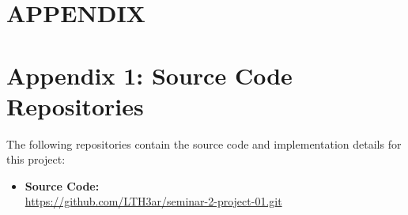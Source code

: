 \section*{APPENDIX}
\setcounter{section}{1}
\setcounter{subsection}{0}
\section*{Appendix 1: Source Code Repositories}\label{pl:dac}

The following repositories contain the source code and implementation details for this project:

\begin{itemize}
    \item \textbf{Source Code:} \\
    \url{https://github.com/LTH3ar/seminar-2-project-01.git}
    
\end{itemize}